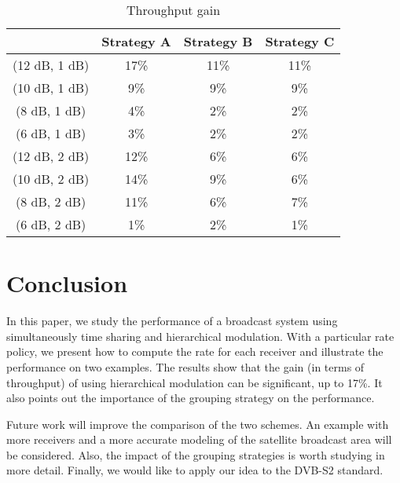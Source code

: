 \documentclass[conference, letterpaper]{IEEEtran}
\begin{document}
\begin{table}[!ht]
\renewcommand{\arraystretch}{1.1}
\caption{Throughput gain}
\label{gain_sh}
\centering
\begin{tabular}{c|c|c|c}
\hline
 & Strategy A & Strategy B & Strategy C \\
\hline
\rowcolor{Gray}
(12 dB, 1 dB) & 17\% & 11\% & 11\% \\
\hline
(10 dB, 1 dB) & 9\% & 9\% & 9\% \\
\hline
\rowcolor{Gray}
(8 dB, 1 dB) & 4\% & 2\% & 2\% \\
\hline
(6 dB, 1 dB) & 3\% & 2\% & 2\% \\
\hline
\rowcolor{Gray}
(12 dB, 2 dB) & 12\% & 6\% & 6\% \\
\hline
(10 dB, 2 dB) & 14\% & 9\% & 6\% \\
\hline
\rowcolor{Gray}
(8 dB, 2 dB) & 11\% & 6\% & 7\% \\
\hline
(6 dB, 2 dB) & 1\% & 2\% & 1\% \\
\hline
\end{tabular}
\end{table}
 \section{Conclusion}\label{conclusion}

In this paper, we study the performance of a broadcast system using simultaneously time sharing and hierarchical modulation. With a particular rate policy, we present how to compute the rate for each receiver and illustrate the performance on two examples. The results show that the gain (in terms of throughput) of using hierarchical modulation can be significant, up to 17\%. It also points out the importance of the grouping strategy on the performance.

Future work will improve the comparison of the two schemes. An example with more receivers and a more accurate modeling of the satellite broadcast area will be considered. Also, the impact of the grouping strategies is worth studying in more detail. Finally, we would like to apply our idea to the DVB-S2 standard.
 
\end{document}
